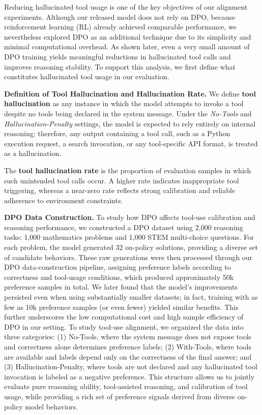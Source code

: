Reducing hallucinated tool usage is one of the key objectives of our alignment experiments. 
Although our released model does not rely on DPO, because reinforcement learning (RL) already achieved comparable performance, we nevertheless explored DPO as an additional technique due to its simplicity and minimal computational overhead. As shown later, even a very small amount of DPO training yields meaningful reductions in hallucinated tool calls and improves reasoning stability. To support this analysis, we first define what constitutes hallucinated tool usage in our evaluation.

\noindent\textbf{Definition of Tool Hallucination and Hallucination Rate.}  
We define \textbf{tool hallucination} as any instance in which the model attempts to invoke a tool despite no tools being declared in the system message. Under the \textit{No-Tools} and \textit{Hallucination-Penalty} settings, the model is expected to rely entirely on internal reasoning; therefore, any output containing a tool call, such as a Python execution request, a search invocation, or any tool-specific API format, is treated as a hallucination.

The \textbf{tool hallucination rate} is the proportion of evaluation samples in which such unintended tool calls occur. A higher rate indicates inappropriate tool triggering, whereas a near-zero rate reflects strong calibration and reliable adherence to environment constraints.

\noindent\textbf{DPO Data Construction.}  
To study how DPO affects tool-use calibration and reasoning performance, we constructed a DPO dataset using 2{,}000 reasoning tasks: 1{,}000 mathematics problems and 1{,}000 STEM multi-choice questions. For each problem, the model generated 32 on-policy solutions, providing a diverse set of candidate behaviors. These raw generations were then processed through our DPO data-construction pipeline, assigning preference labels according to correctness and tool-usage conditions, which produced approximately 50k preference samples in total. We later found that the model’s improvements persisted even when using substantially smaller datasets; in fact, training with as few as 10k preference samples (or even fewer) yielded similar benefits. This further underscores the low computational cost and high sample efficiency of DPO in our setting. To study tool-use alignment, we organized the data into three categories: (1) No-Tools, where the system message does not expose tools and correctness alone determines preference labels; (2) With-Tools, where tools are available and labels depend only on the correctness of the final answer; and (3) Hallucination-Penalty, where tools are not declared and any hallucinated tool invocation is labeled as a negative preference. This structure allows us to jointly evaluate pure reasoning ability, tool-assisted reasoning, and calibration of tool usage, while providing a rich set of preference signals derived from diverse on-policy model behaviors.


